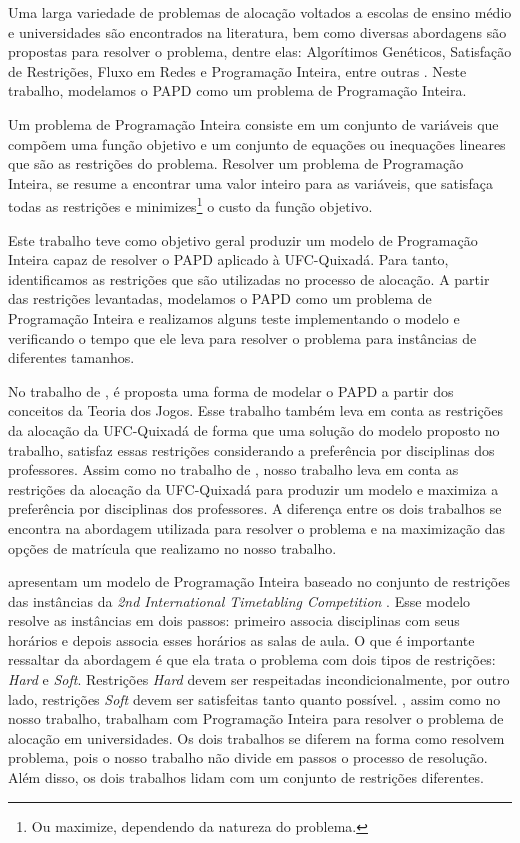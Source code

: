 Uma larga variedade de problemas de alocação voltados a escolas de ensino médio e universidades são encontrados na literatura, bem como diversas abordagens são propostas para resolver o problema, dentre elas: Algorítimos Genéticos, Satisfação de Restrições, Fluxo em Redes e Programação Inteira, entre outras \cite{schaerf1999survey}. Neste trabalho, modelamos o PAPD como um problema de Programação Inteira. 

Um problema de Programação Inteira consiste em um conjunto de variáveis que compõem uma função objetivo e um conjunto de equações ou inequações lineares que são as restrições do problema. Resolver um problema de Programação Inteira, se resume a encontrar uma valor inteiro para as variáveis, que satisfaça todas as restrições e minimizes\footnote{Ou maximize, dependendo da natureza do problema.} o custo da função objetivo.

Este trabalho teve como objetivo geral produzir um modelo de Programação Inteira capaz de resolver o PAPD aplicado à UFC-Quixadá. Para tanto, identificamos as restrições que são utilizadas no processo de alocação. A partir das restrições levantadas, modelamos o PAPD como um problema de Programação Inteira e realizamos alguns teste implementando o modelo e verificando o tempo que ele leva para resolver o problema para instâncias de diferentes tamanhos.

No trabalho de , é proposta uma forma de modelar o PAPD a partir dos conceitos da Teoria dos Jogos. Esse trabalho também leva em conta as restrições da alocação da UFC-Quixadá de forma que uma solução do modelo proposto no trabalho, satisfaz essas restrições considerando a preferência por disciplinas dos professores. Assim como no trabalho de , nosso trabalho leva em conta as restrições da alocação da UFC-Quixadá para produzir um modelo e maximiza a preferência por disciplinas dos professores. A diferença entre os dois trabalhos se encontra na abordagem utilizada para resolver o problema e na maximização das opções de matrícula que realizamo no nosso trabalho. 

 apresentam um modelo de Programação Inteira baseado no conjunto de restrições das instâncias da \textit{2nd International Timetabling Competition} \cite{itc}. Esse modelo resolve as instâncias em dois passos: primeiro  associa disciplinas com seus horários e depois associa esses horários as salas de aula. O que é importante ressaltar da abordagem é que ela trata o problema com dois tipos de restrições: \textit{Hard} e \textit{Soft}. Restrições \textit{Hard} devem ser respeitadas incondicionalmente, por outro lado, restrições \textit{Soft} devem ser satisfeitas tanto quanto possível. , assim como no nosso trabalho, trabalham com Programação Inteira para resolver o problema de alocação em universidades. Os dois trabalhos se diferem na forma como resolvem problema, pois o nosso trabalho não divide em passos o processo de resolução. Além disso, os dois trabalhos lidam com um conjunto de restrições diferentes.

